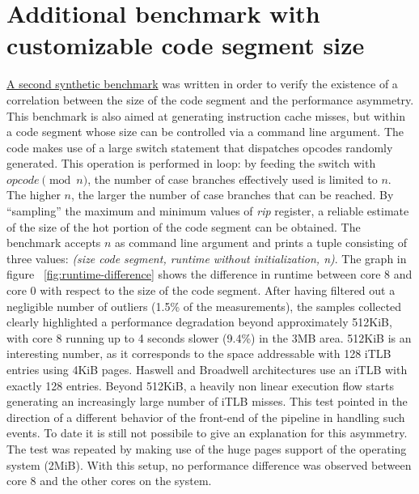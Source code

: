 \documentclass[a4paper]{jpconf}
\begin{document}
\section{Additional benchmark with customizable code segment size}
\label{section:benchmark-itlb}
\href{https://gitlab.cern.ch/snippets/217}{A second synthetic benchmark} 
was written in order to verify the existence of a 
correlation between the size of the code segment and the performance 
asymmetry. This benchmark is also aimed at generating instruction cache misses,
but within a code segment whose size can be controlled via a command line 
argument. The code makes use of a large switch statement that dispatches
opcodes randomly generated. This operation is performed in loop: 
by feeding the switch with $opcode\pmod n$, the number of case 
branches effectively used is limited to $n$. The higher $n$, the larger the
number of case branches that can be reached. By ``sampling'' the 
maximum and minimum values of \textit{rip} register, a reliable estimate of the 
size of the hot portion of the code segment can be obtained. The
benchmark accepts $n$ as command line argument and prints a tuple consisting of
three values: \textit{(size code segment, runtime without initialization, n)}.
The graph in figure ~\ref{fig:runtime-difference} shows the difference in runtime 
between core 8 and core 0 with respect to the size of the code segment. After having 
filtered out a negligible number of outliers (1.5\% of the measurements), 
the samples collected clearly highlighted a performance 
degradation beyond approximately 512KiB, with core 8 running up to 4 seconds slower
(9.4\%) in the 3MB area. 512KiB is an interesting number, as it 
corresponds to the space addressable with 128 iTLB entries using 4KiB pages. 
Haswell and Broadwell architectures use an iTLB with exactly 128 entries. 
Beyond 512KiB, a heavily non linear execution flow starts generating an increasingly 
large number of iTLB misses. This test pointed in the direction of a different 
behavior of the front-end of the pipeline in handling such events. To date
it is still not possibile to give an explanation for this asymmetry.
\\
The test was repeated by making use of the huge pages support of the operating
system (2MiB). With this setup, no performance difference was observed between 
core 8 and the other cores on the system.
\end{document}
